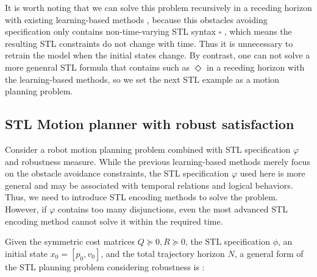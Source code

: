 \documentclass[a4paper]{report}
\begin{document}
It is worth noting that we can solve this problem recursively in a receding horizon with existing learning-based methods \cite[]{bertsimas2022online}\cite[]{Cauligi2020}\cite[]{bertsimas2021voice}, because this obstacles avoiding specification only contains non-time-varying STL syntax $\square$ , which means the resulting STL constraints do not change with time. Thus it is unnecessary to retrain the model when the initial states change. By contrast, one can not solve a more genenral STL formula that contains such as $\Diamond$ in a receding horizon with the learning-based methods, so we set the next STL example as a motion planning problem.

\subsection{STL Motion planner with robust satisfaction} 
\label{STL_motion_planner}
Consider a robot motion planning problem combined with STL specification $\varphi$ and robustness measure. While the previous learning-based methods merely focus on the obstacle avoidance constraints, the STL specification $\varphi$ used here is more general and may be associated with temporal relations and logical behaviors. Thus, we need to introduce STL encoding methods to solve the problem. However, if $\varphi$ contains too many disjunctions, even the most advanced STL encoding method \cite{kurtz2022mixed} cannot solve it within the required time.

Given the symmetric cost matrices $Q\succeq 0,R\succeq 0 $, the STL specification $\phi$, an initial state $x_0=[p_0,v_0]$, and the total trajectory horizon $N$, a general form of the STL planning problem considering robustness is :
\end{document}
